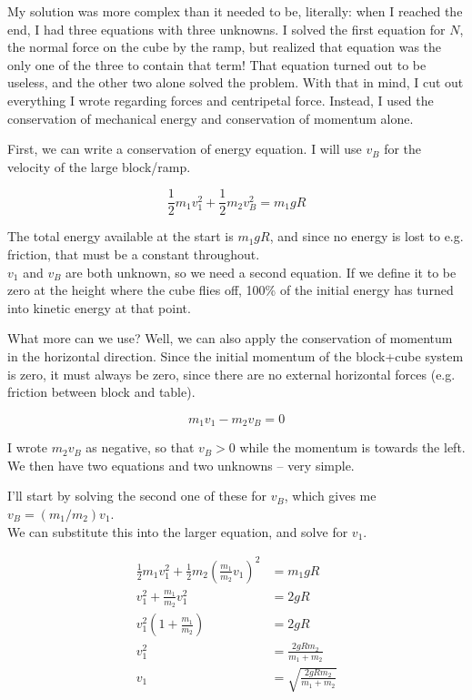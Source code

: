 \documentclass[8.01x]{subfiles}
\begin{document}
My solution was more complex than it needed to be, literally: when I reached the end, I had three equations with three unknowns. I solved the first equation for $N$, the normal force on the cube by the ramp, but realized that equation was the only one of the three to contain that term! That equation turned out to be useless, and the other two alone solved the problem. With that in mind, I cut out everything I wrote regarding forces and centripetal force. Instead, I used the conservation of mechanical energy and conservation of momentum alone.

First, we can write a conservation of energy equation. I will use $v_B$ for the velocity of the large block/ramp.

\begin{equation}
\frac{1}{2} m_1 v_1^2 + \frac{1}{2} m_2 v_B^2 = m_1 g R
\end{equation}

The total energy available at the start is $m_1 g R$, and since no energy is lost to e.g. friction, that must be a constant throughout.\\
$v_1$ and $v_B$ are both unknown, so we need a second equation. If we define it to be zero at the height where the cube flies off, 100\% of the initial energy has turned into kinetic energy at that point.

What more can we use? Well, we can also apply the conservation of momentum in the horizontal direction. Since the initial momentum of the block+cube system is zero, it must always be zero, since there are no external horizontal forces (e.g. friction between block and table).

\begin{equation}
m_1 v_1 - m_2 v_B = 0
\end{equation}

I wrote $m_2 v_B$ as negative, so that $v_B > 0$ while the momentum is towards the left.\\
We then have two equations and two unknowns -- very simple.

I'll start by solving the second one of these for $v_B$, which gives me $v_B = (m_1/m_2) v_1$.\\
We can substitute this into the larger equation, and solve for $v_1$.

\begin{align}
\frac{1}{2} m_1 v_1^2 + \frac{1}{2} m_2 \left(\frac{m_1}{m_2} v_1\right)^2 &= m_1 g R\\
v_1^2 + \frac{m_1}{m_2} v_1^2 &= 2g R\\
v_1^2 \left(1 + \frac{m_1}{m_2}\right) &= 2g R\\
v_1^2 &= \frac{2g R m_2 }{m_1 + m_2}\\
v_1 &= \sqrt{\frac{2g R m_2 }{m_1 + m_2}}
\end{align}
\end{document}
